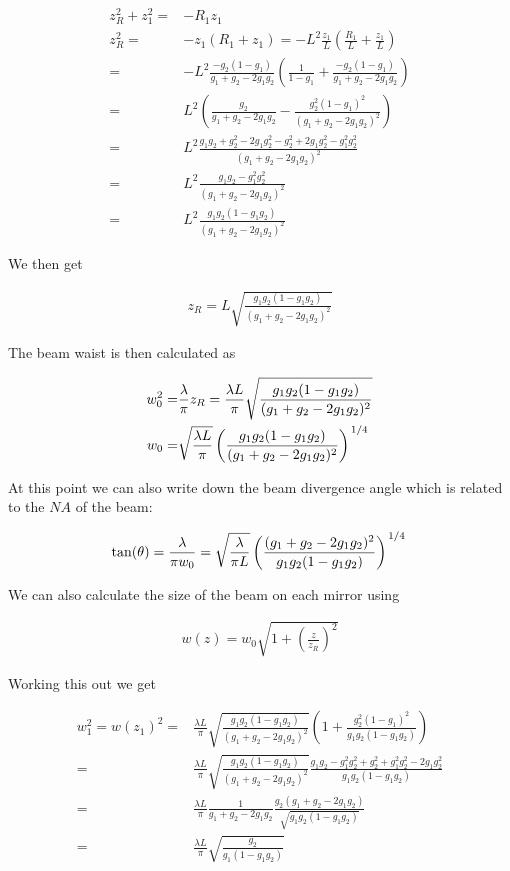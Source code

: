\documentclass[12pt]{article}
\newcommand{\slfrac}[2]{\left.#1\middle/#2\right.}
\begin{document}
\begin{align}
z_R^2 + z_1^2 =& -R_1z_1\\
z_R^2 =& -z_1(R_1+z_1)=-L^2 \frac{z_1}{L}\left(\frac{R_1}{L} + \frac{z_1}{L}\right)\\
=& -L^2 \frac{-g_2(1-g_1)}{g_1+g_2 - 2g_1g_2}\left(\frac{1}{1-g_1} +\frac{-g_2(1-g_1)}{g_1+g_2-2g_1 g_2}\right)\\
=& L^2\left(\frac{g_2}{g_1+g_2-2g_1g_2} - \frac{g_2^2(1-g_1)^2}{(g_1+g_2-2g_1g_2)^2}\right)\\
=& L^2 \frac{g_1g_2 + g_2^2 -2g_1g_2^2 -g_2^2 +2g_1g_2^2-g_1^2g_2^2}{(g_1+g_2-2g_1g_2)^2}\\
=& L^2 \frac{g_1g_2 - g_1^2g_2^2}{(g_1+g_2-2g_1g_2)^2}\\
=& L^2 \frac{g_1g_2(1-g_1g_2)}{(g_1+g_2-2g_1g_2)^2}
\end{align}

We then get

\begin{align}
z_R = L\sqrt{\frac{g_1g_2(1-g_1g_2)}{(g_1+g_2-2g_1g_2)^2}}
\end{align}

The beam waist is then calculated as

\begin{align}
w_0^2 =& \frac{\lambda}{\pi}z_R = \frac{\lambda L}{\pi}\sqrt{\frac{g_1g_2(1-g_1g_2)}{(g_1+g_2-2g_1g_2)^2}}\\
w_0 =& \sqrt{\frac{\lambda L}{\pi}}\left(\frac{g_1g_2(1-g_1g_2)}{(g_1+g_2-2g_1g_2)^2}\right)^{\slfrac{1}{4}}
\end{align}

At this point we can also write down the beam divergence angle which is related to the $NA$ of the beam:

\begin{align}
\tan(\theta) = \frac{\lambda}{\pi w_0} = \sqrt{\frac{\lambda}{\pi L}}\left(\frac{(g_1+g_2 - 2g_1 g_2)^2}{g_1g_2(1-g_1g_2)}\right)^{\slfrac{1}{4}}
\end{align}

We can also calculate the size of the beam on each mirror using

\begin{align}
w(z) = w_0 \sqrt{1+\left(\frac{z}{z_R}\right)^2}
\end{align}

Working this out we get

\begin{align}
w_1^2=w(z_1)^2 =& \frac{\lambda L}{\pi} \sqrt{\frac{g_1g_2(1-g_1g_2)}{(g_1+g_2-2g_1g_2)^2}}\left(1+\frac{g_2^2(1-g_1)^2}{g_1g_2(1-g_1g_2)}\right)\\
=& \frac{\lambda L}{\pi} \sqrt{\frac{g_1g_2(1-g_1g_2)}{(g_1+g_2-2g_1g_2)^2}} \frac{g_1g_2 - g_1^2 g_2^2 + g_2^2 + g_1^2g_2^2 - 2 g_1 g_2^2}{g_1g_2(1-g_1g_2)}\\
=& \frac{\lambda L}{\pi} \frac{1}{g_1 + g_2 - 2g_1 g_2} \frac{g_2(g_1+g_2 - 2g_1g_2)}{\sqrt{g_1 g_2(1-g_1g_2)}}\\
=& \frac{\lambda L}{\pi} \sqrt{\frac{g_2}{g_1(1-g_1g_2)}}
\end{align}
\end{document}
